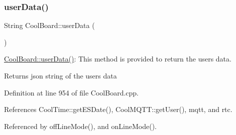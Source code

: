 \mbox{\label{classCoolBoard_ae7358fb6e623cfc81b775f5f1734909b}} 
\subsubsection{\texorpdfstring{user\+Data()}{userData()}}
{\footnotesize\ttfamily String Cool\+Board\+::user\+Data (\begin{DoxyParamCaption}{ }\end{DoxyParamCaption})}

\hyperlink{classCoolBoard_ae7358fb6e623cfc81b775f5f1734909b}{Cool\+Board\+::user\+Data()}\+: This method is provided to return the user\textquotesingle{}s data.

\begin{DoxyReturn}{Returns}
json string of the user\textquotesingle{}s data 
\end{DoxyReturn}


Definition at line 954 of file Cool\+Board.\+cpp.



References Cool\+Time\+::get\+E\+S\+Date(), Cool\+M\+Q\+T\+T\+::get\+User(), mqtt, and rtc.



Referenced by off\+Line\+Mode(), and on\+Line\+Mode().


